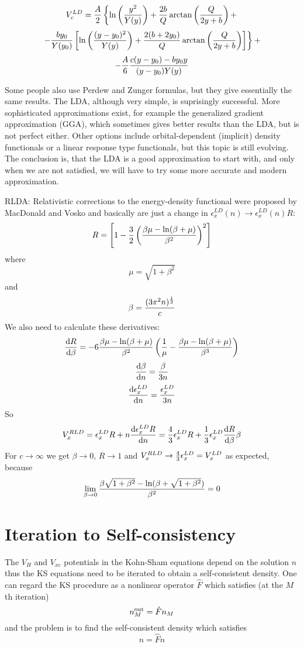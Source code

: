 $$V_c^{LD}={A\over2}\left\{
\ln\left(y^2\over Y(y)\right)+{2b\over Q}\arctan\left(Q\over 2y+b\right)+
\right.
$$
$$\left.
-{by_0\over Y(y_0)}\left[\ln\left((y-y_0)^2\over Y(y)\right)
+{2(b+2y_0)\over Q}\arctan\left(Q\over 2y+b\right)
\right] \right\}+$$
$$
-{A\over6}{c(y-y_0)-by_0y\over (y-y_0)Y(y)}
$$

Some people also use Perdew and Zunger formulas, but they give essentially the
same results.
The LDA, although very simple, is suprisingly successful. More sophisticated
approximations exist, for example the generalized gradient approximation (GGA),
which sometimes gives better results than the LDA, but is not perfect either.
Other options include orbital-dependent (implicit) density functionals or a
linear response type functionals, but this topic is still evolving. The
conclusion is, that the LDA is a good approximation to start with, and only
when we are not satisfied, we will have to try some more accurate and modern
approximation.

RLDA: Relativistic corrections to the energy-density functional were proposed
by MacDonald and Vosko and basically are just a change in 
$\epsilon_x^{LD}(n)\rightarrow\epsilon_x^{LD}(n)R$:
$$R = 
\left[1-{3\over2}\left(\beta\mu-\ln(\beta+\mu)\over\beta^2\right)^2\right]$$
where
$$\mu=\sqrt{1+\beta^2}$$
and
$$\beta={(3\pi^2n)^{1\over3}\over c}$$
We also need to calculate these derivatives:
$${{\rm d} R\over{\rm d} \beta}=
-6{\beta\mu-\ln(\beta+\mu)\over\beta^2}\left({1\over\mu}-
{\beta\mu-\ln(\beta+\mu)\over\beta^3}\right)
$$
$${{\rm d} \beta\over{\rm d} n}={\beta\over 3n}$$
$${{\rm d} \epsilon_x^{LD}\over{\rm d} n}={\epsilon_x^{LD}\over 3n}$$
So
$$V_x^{RLD}=\epsilon_x^{LD}R+n{{\rm d} \epsilon_x^{LD}R\over{\rm d} n}=
{4\over3}\epsilon_x^{LD}R+{1\over3}\epsilon_x^{LD}{{\rm d} R\over{\rm d}\beta}\beta$$
For $c\to\infty$ we get $\beta\to0$, $R\to1$ and 
$V_x^{RLD}\to {4\over3}\epsilon_x^{LD}=V_x^{LD}$ as expected, because
$$\lim_{\beta\to0}{\beta\sqrt{1+\beta^2}-\ln(\beta+\sqrt{1+\beta^2})\over
\beta^2} = 0$$

\section{Iteration to Self-consistency}

The $V_H$ and $V_{xc}$ potentials in the Kohn-Sham equations  depend
on the solution $n$ thus the KS equations need to be iterated to obtain a 
self-consistent density. One can regard the KS procedure as a nonlinear operator
$\hat F$ which satisfies (at the $M$th iteration)
$$n_M^{\rm out}=\hat F n_M $$
and the problem is to find the self-consistent density which satisfies
$$n=\hat F n $$

